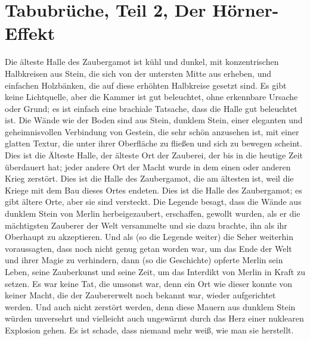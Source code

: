 \chapter{Tabubrüche, Teil 2, Der Hörner-Effekt}

Die älteste Halle des Zaubergamot ist kühl und dunkel, mit konzentrischen
Halbkreisen aus Stein, die sich von der untersten Mitte aus erheben, und
einfachen Holzbänken, die auf diese erhöhten Halbkreise gesetzt sind. Es gibt
keine Lichtquelle, aber die Kammer ist gut beleuchtet, ohne erkennbare Ursache
oder Grund; es ist einfach eine brachiale Tatsache, dass die Halle gut
beleuchtet ist. Die Wände wie der Boden sind aus Stein, dunklem Stein, einer
eleganten und geheimnisvollen Verbindung von Gestein, die sehr schön anzusehen
ist, mit einer glatten Textur, die unter ihrer Oberfläche zu fließen und sich zu
bewegen scheint. Dies ist die Älteste Halle, der älteste Ort der Zauberei, der
bis in die heutige Zeit überdauert hat; jeder andere Ort der Macht wurde in dem
einen oder anderen Krieg zerstört. Dies ist die Halle des Zaubergamot, die am
ältesten ist, weil die Kriege mit dem Bau dieses Ortes endeten. Dies ist die
Halle des Zaubergamot; es gibt ältere Orte, aber sie sind versteckt. Die Legende
besagt, dass die Wände aus dunklem Stein von Merlin herbeigezaubert, erschaffen,
gewollt wurden, als er die mächtigsten Zauberer der Welt versammelte und sie
dazu brachte, ihn als ihr Oberhaupt zu akzeptieren. Und als (so die Legende
weiter) die Seher weiterhin voraussagten, dass noch nicht genug getan worden
war, um das Ende der Welt und ihrer Magie zu verhindern, dann (so die
Geschichte) opferte Merlin sein Leben, seine Zauberkunst und seine Zeit, um das
Interdikt von Merlin in Kraft zu setzen. Es war keine Tat, die umsonst war, denn
ein Ort wie dieser konnte von keiner Macht, die der Zaubererwelt noch bekannt
war, wieder aufgerichtet werden. Und auch nicht zerstört werden, denn diese
Mauern aus dunklem Stein würden unversehrt und vielleicht auch ungewärmt durch
das Herz einer nuklearen Explosion gehen. Es ist schade, dass niemand mehr weiß,
wie man sie herstellt.

